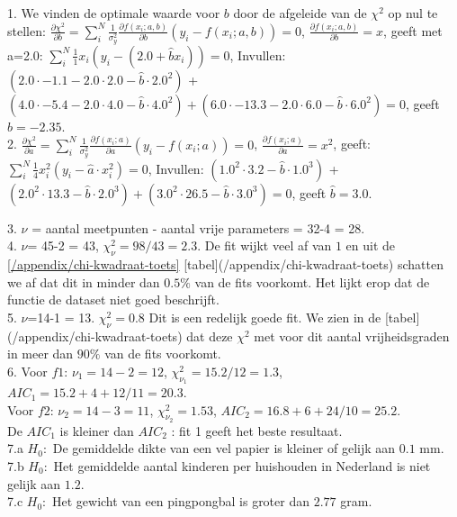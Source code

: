 1. We vinden de optimale waarde voor $b$ door de afgeleide van de $\chi^2$ op nul te stellen: ${\frac{\partial \chi^2}{\partial b} = \sum_i^N \frac{1}{\sigma_y^2} \frac{\partial f(x_i;a,b)}{\partial b} \left(y_i - f(x_i;a,b)\right) = 0 }$,
$\frac{\partial f(x_i;a,b)}{\partial b} = x$, 
geeft met a=2.0: 
${\sum_i^N \frac{1}{1} x_i(y_i - (2.0 + \hat{b} x_i )) = 0}$, 
Invullen: 
$(2.0\cdot -1.1 - 2.0\cdot 2.0 - \hat{b} \cdot 2.0^2)$ +  $(4.0\cdot -5.4 - 2.0\cdot 4.0 - \hat{b} \cdot 4.0^2) + (6.0\cdot -13.3 - 2.0 \cdot 6.0 - \hat{b} \cdot 6.0^2) = 0$,
 geeft $\hat{b} = -2.35$.\\


2. ${\frac{\partial \chi^2}{\partial a} = \sum_i^N \frac{1}{\sigma_y^2} \frac{\partial f(x_i;a)}{\partial a} \left(y_i - f(x_i;a)\right) = 0 }$,
$\frac{\partial f(x_i;a)}{\partial a} = x^2$,
geeft:
${\sum_i^N \frac{1}{4} x^2_i \left( y_i - \hat{a} \cdot x_i^2 \right) = 0}$,
Invullen:
$(1.0^2 \cdot 3.2 - \hat{b} \cdot 1.0^3)$ +  $(2.0^2 \cdot 13.3 - \hat{b} \cdot 2.0^3) + (3.0^2 \cdot 26.5 - \hat{b} \cdot 3.0^3) = 0$,
geeft $\hat{b} = 3.0$.


3. $\nu$ = aantal meetpunten - aantal vrije parameters = 32-4 = 28.\\


4. $\nu$= 45-2 = 43, $\chi^2_\nu = 98/43 =2.3$. De fit wijkt veel af van $1$ en uit de \ref{/appendix/chi-kwadraat-toets} [tabel](/appendix/chi-kwadraat-toets) schatten we af dat dit in minder dan $0.5\%$ van de fits voorkomt. Het lijkt erop dat de functie de dataset niet goed beschrijft.\\


5. $\nu$=14-1 = 13. $\chi^2_\nu = 0.8$ Dit is een redelijk goede fit. We zien in de [tabel](/appendix/chi-kwadraat-toets) dat deze $\chi^2$ met voor dit aantal vrijheidsgraden in meer dan $90\%$ van de fits voorkomt.\\


6. Voor $f1$: $\nu_1 = 14-2 = 12$, $\chi^2_{\nu_1} = 15.2/12 = 1.3$, $AIC_1 = 15.2 + 4 + 12/11 = 20.3$.\\
Voor $f2$: $\nu_2 = 14 -3 = 11$, $\chi^2_{\nu_2} = 1.53 $, $AIC_2 = 16.8 + 6 + 24/10 = 25.2$.\\
De $AIC_1$ is kleiner dan $AIC_2$ : fit 1 geeft het beste resultaat.\\


7.a $H_0:$ De gemiddelde dikte van een vel papier is kleiner of gelijk aan $0.1$ mm.\\
7.b $H_0:$ Het gemiddelde aantal kinderen per huishouden in Nederland is niet gelijk aan $1.2$.\\
7.c  $H_0:$ Het gewicht van een pingpongbal is groter dan $2.77$ gram.\\


